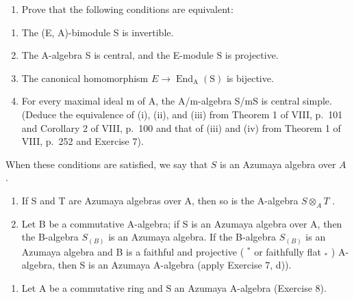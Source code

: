 \begin{enumerate}
\def\labelenumi{\alph{enumi})}
\tightlist
\item
  Prove that the following conditions are equivalent:
\end{enumerate}

\begin{enumerate}
\def\labelenumi{(\roman{enumi})}
\item
  The (E, A)-bimodule S is invertible.
\item
  The A-algebra S is central, and the E-module S is projective.
\item
  The canonical homomorphism \(E \longrightarrow \operatorname{End}_{\mathrm{A}}(\mathrm{S})\) is bijective.
\item
  For every maximal ideal m of A, the A/m-algebra S/mS is central simple. (Deduce the equivalence of (i), (ii), and (iii) from Theorem 1 of VIII, p.~101 and Corollary 2 of VIII, p.~100 and that of (iii) and (iv) from Theorem 1 of VIII, p.~252 and Exercise 7).
\end{enumerate}

When these conditions are satisfied, we say that \(S\) is an Azumaya algebra over \(A\) .

\begin{enumerate}
\def\labelenumi{\alph{enumi})}
\setcounter{enumi}{1}
\item
  If S and T are Azumaya algebras over A, then so is the A-algebra \(S \otimes_{A} T\) .
\item
  Let B be a commutative A-algebra; if S is an Azumaya algebra over A, then the B-algebra \(S_{(B)}\) is an Azumaya algebra. If the B-algebra \(S_{(B)}\) is an Azumaya algebra and B is a faithful and projective ( \(^{*}\) or faithfully flat \(_{*}\) ) A-algebra, then S is an Azumaya A-algebra (apply Exercise 7, d)).
\end{enumerate}

\begin{enumerate}
\def\labelenumi{\arabic{enumi})}
\setcounter{enumi}{8}
\tightlist
\item
  Let \(\mathrm{A}\) be a commutative ring and \(\mathrm{S}\) an Azumaya A-algebra (Exercise 8).
\end{enumerate}

